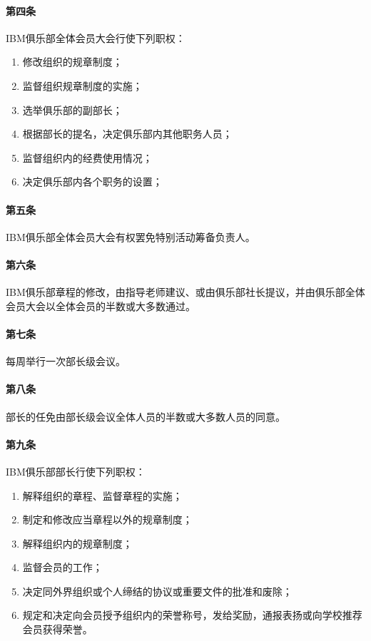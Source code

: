 \documentclass{club}
\begin{document}
\paragraph{第四条}IBM俱乐部全体会员大会行使下列职权：
\begin{enumerate}
    \item 修改组织的规章制度；
    \item 监督组织规章制度的实施；
    \item 选举俱乐部的副部长；
    \item 根据部长的提名，决定俱乐部内其他职务人员；
    \item 监督组织内的经费使用情况；
    \item 决定俱乐部内各个职务的设置；
\end{enumerate}
\paragraph{第五条}IBM俱乐部全体会员大会有权罢免特别活动筹备负责人。
\paragraph{第六条}IBM俱乐部章程的修改，由指导老师建议、或由俱乐部社长提议，并由俱乐部全体会员大会以全体会员的半数或大多数通过。
\paragraph{第七条}每周举行一次部长级会议。
\paragraph{第八条}部长的任免由部长级会议全体人员的半数或大多数人员的同意。
\paragraph{第九条}IBM俱乐部部长行使下列职权：
\begin{enumerate}
    \item 解释组织的章程、监督章程的实施；
    \item 制定和修改应当章程以外的规章制度；
    \item 解释组织内的规章制度；
    \item 监督会员的工作；
    \item 决定同外界组织或个人缔结的协议或重要文件的批准和废除；
    \item 规定和决定向会员授予组织内的荣誉称号，发给奖励，通报表扬或向学校推荐会员获得荣誉。
\end{enumerate}
\end{document}
